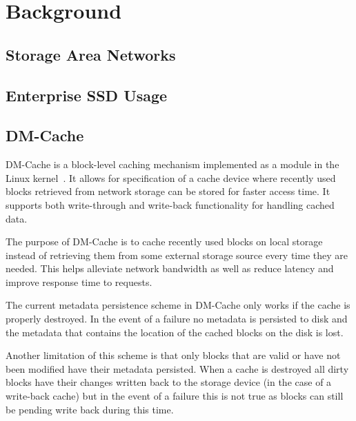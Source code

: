 \section{Background}

\subsection{Storage Area Networks}

\subsection{Enterprise SSD Usage}

\subsection{DM-Cache}

DM-Cache is a block-level caching mechanism implemented as a module in
the Linux kernel~\cite{DM-Cache}. It allows for specification of a
cache device where recently used blocks retrieved from network storage
can be stored for faster access time. It supports both write-through
and write-back functionality for handling cached data.

The purpose of DM-Cache is to cache recently used blocks on local
storage instead of retrieving them from some external storage source
every time they are needed. This helps alleviate network bandwidth as
well as reduce latency and improve response time to requests.

The current metadata persistence scheme in DM-Cache only works if the
cache is properly destroyed. In the event of a failure no metadata is
persisted to disk and the metadata that contains the location of the
cached blocks on the disk is lost.

Another limitation of this scheme is that only blocks that are valid
or have not been modified have their metadata persisted. When a cache
is destroyed all dirty blocks have their changes written back to the
storage device (in the case of a write-back cache) but in the event of
a failure this is not true as blocks can still be pending write back
during this time.
